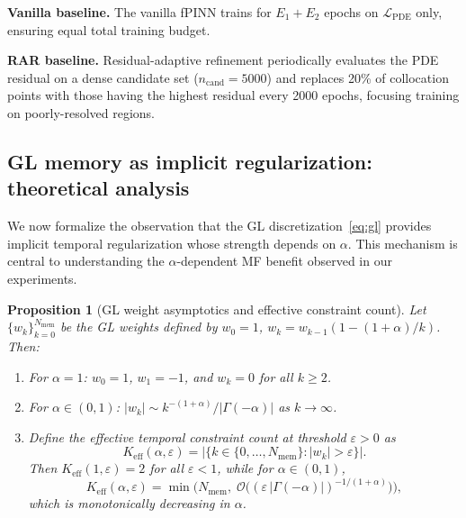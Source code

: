 \documentclass[preprint,12pt]{elsarticle}
\newtheorem{proposition}{Proposition}
\newcommand{\Lcal}{\mathcal{L}}
\begin{document}
\textbf{Vanilla baseline.} The vanilla fPINN trains for $E_1 + E_2$ epochs on $\Lcal_{\mathrm{PDE}}$ only, ensuring equal total training budget.

\textbf{RAR baseline.} Residual-adaptive refinement \cite{wu2023comprehensive} periodically evaluates the PDE residual on a dense candidate set ($n_{\mathrm{cand}} = 5000$) and replaces 20\% of collocation points with those having the highest residual every 2000 epochs, focusing training on poorly-resolved regions.

\subsection{GL memory as implicit regularization: theoretical analysis}
\label{sec:gl_theory}

We now formalize the observation that the GL discretization~\eqref{eq:gl} provides implicit temporal regularization whose strength depends on $\alpha$. This mechanism is central to understanding the $\alpha$-dependent MF benefit observed in our experiments.

\begin{proposition}[GL weight asymptotics and effective constraint count]
\label{prop:keff}
Let $\{w_k\}_{k=0}^{N_{\mathrm{mem}}}$ be the GL weights defined by $w_0 = 1$, $w_k = w_{k-1}(1-(1+\alpha)/k)$. Then:
\begin{enumerate}
\item[(i)] For $\alpha = 1$: $w_0 = 1$, $w_1 = -1$, and $w_k = 0$ for all $k \geq 2$.
\item[(ii)] For $\alpha \in (0,1)$: $|w_k| \sim k^{-(1+\alpha)} / |\Gamma(-\alpha)|$ as $k \to \infty$.
\item[(iii)] Define the effective temporal constraint count at threshold $\varepsilon > 0$ as
\begin{equation}
\label{eq:keff}
K_{\mathrm{eff}}(\alpha, \varepsilon) = \bigl|\{k \in \{0, \ldots, N_{\mathrm{mem}}\} : |w_k| > \varepsilon\}\bigr|.
\end{equation}
Then $K_{\mathrm{eff}}(1, \varepsilon) = 2$ for all $\varepsilon < 1$, while for $\alpha \in (0,1)$,
\begin{equation}
K_{\mathrm{eff}}(\alpha, \varepsilon) = \min\bigl(N_{\mathrm{mem}},\; \mathcal{O}\bigl((\varepsilon\,|\Gamma(-\alpha)|)^{-1/(1+\alpha)}\bigr)\bigr),
\end{equation}
which is monotonically decreasing in $\alpha$.
\end{enumerate}
\end{proposition}
\end{document}
